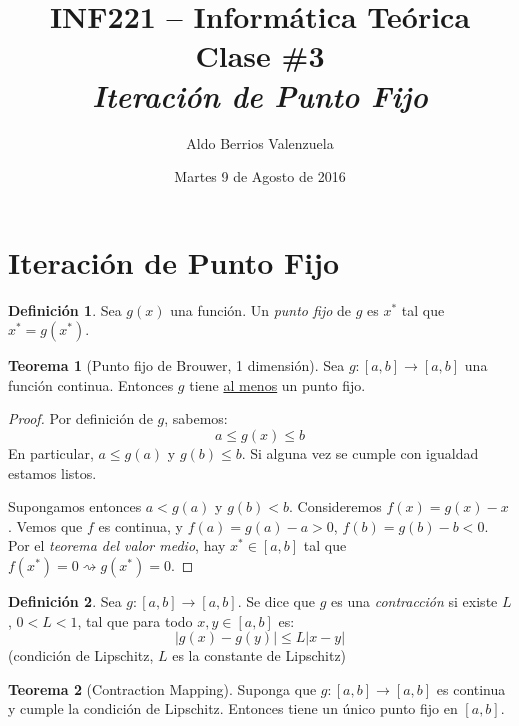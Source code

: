 \documentclass[english, spanish, fleqn, 10pt]{article}
\author{Aldo Berrios Valenzuela}
\title{INF221 -- Informática Teórica\\[.4\baselineskip]Clase \#3\\\textit{Iteración de Punto Fijo}}
\date{Martes 9 de Agosto de 2016}
\numberwithin{equation}{section}
\newcommand{\nparentesis}[1]{\left( #1 \right)}
\newcommand{\nabsoluto}[1]{\left| #1 \right|}
\newcommand{\ncorchetes}[1]{\left[ #1 \right]}
\theoremstyle{definition}
\newtheorem{teorema}{Teorema}[section]
\newtheorem{definition}{Definición}[section]
\begin{document}
\maketitle
\section{Iteración de Punto Fijo}
\begin{definition}
	Sea $g\nparentesis{x}$ una función. Un \emph{punto fijo} de $g$ es $x^*$ tal que $x^*=g\nparentesis{x^*}$.
\end{definition}

\begin{teorema}[Punto fijo de Brouwer, 1 dimensión]
	Sea $g:\ncorchetes{a, b}\rightarrow\ncorchetes{a, b}$ una función continua. Entonces $g$ tiene \underline{al menos} un punto fijo.
\end{teorema}
\begin{proof}
	Por definición de $g$, sabemos:
	\begin{equation*}
	a\leq g\nparentesis{x} \leq b
	\end{equation*}
	En particular, $a\leq g\nparentesis{a}$ y $g\nparentesis{b}\leq b$. Si alguna vez se cumple con igualdad estamos listos.
	
	Supongamos entonces $a<g\nparentesis{a}$ y $g\nparentesis{b}<b$. Consideremos $f\nparentesis{x}=g\nparentesis{x}-x$. Vemos que $f$ es continua, y $f\nparentesis{a}=g\nparentesis{a}-a>0$, $f\nparentesis{b}=g\nparentesis{b}-b<0$. Por el \textit{teorema del valor medio}, hay $x^*\in\ncorchetes{a, b}$ tal que $f\nparentesis{x^*}=0\rightsquigarrow g\nparentesis{x^*}=0$.
\end{proof}

\begin{definition}
	Sea $g:\ncorchetes{a, b}\rightarrow \ncorchetes{a, b}$. Se dice que $g$ es una \emph{contracción} si existe $L$, $0<L<1$, tal que para todo $x, y\in\ncorchetes{a, b}$ es:
	\begin{equation}
	\nabsoluto{g\nparentesis{x}-g\nparentesis{y}}\leq L\nabsoluto{x-y}
	\end{equation}
	(condición de Lipschitz, $L$ es la constante de Lipschitz)
\end{definition}

\begin{teorema}[Contraction Mapping]
	Suponga que $g:\ncorchetes{a, b}\rightarrow \ncorchetes{a, b}$ es continua y cumple la condición de Lipschitz. Entonces tiene un único punto fijo en $\ncorchetes{a, b}$.
\end{teorema}
\end{document}
